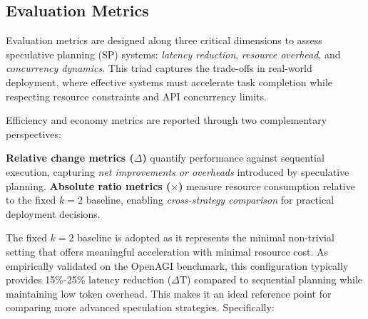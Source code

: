 \subsection{Evaluation Metrics}
Evaluation metrics are designed along three critical dimensions to assess speculative planning (SP) systems: \emph{latency reduction}, \emph{resource overhead}, and \emph{concurrency dynamics}. This triad captures the trade-offs in real-world deployment, where effective systems must accelerate task completion while respecting resource constraints and API concurrency limits.

Efficiency and economy metrics are reported through two complementary perspectives:

\textbf{Relative change metrics ($\Delta$)} quantify performance against sequential execution, capturing \textit{net improvements or overheads} introduced by speculative planning.
\textbf{Absolute ratio metrics ($\times$)} measure resource consumption relative to the fixed $k=2$ baseline, enabling \textit{cross-strategy comparison} for practical deployment decisions.

The fixed $k=2$ baseline is adopted as it represents the minimal non-trivial setting that offers meaningful acceleration with minimal resource cost. As empirically validated on the OpenAGI benchmark, this configuration typically provides 15\%-25\% latency reduction ($\Delta \text{T}$) compared to sequential planning while maintaining low token overhead. This makes it an ideal reference point for comparing more advanced speculation strategies. Specifically:

